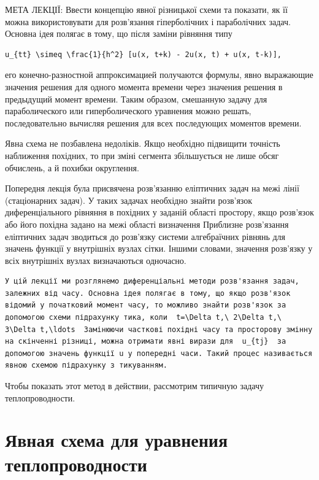 \documentclass[
  ukrainian,
]{article}
\begin{document}
МЕТА ЛЕКЦІЇ: Ввести концепцію явної різницької схеми та показати, як її
можна використовувати для розв'язання гіперболічних і параболічних
задач. Основна ідея полягає в тому, що після заміни рівняння типу

\begin{verbatim}
u_{tt} \simeq \frac{1}{h^2} [u(x, t+k) - 2u(x, t) + u(x, t-k)],
\end{verbatim}

его конечно-разностной аппроксимацией получаются формулы, явно
выражающие значения решения для одного момента времени через значения
решения в предыдущий момент времени. Таким образом, смешанную задачу для
параболического или гиперболического уравнения можно решать,
последовательно вычисляя решения для всех последующих моментов времени.

Явна схема не позбавлена недоліків. Якщо необхідно підвищити точність
наближення похідних, то при зміні сегмента збільшується не лише обсяг
обчислень, а й похибки округлення.

Попередня лекція була присвячена розв'язанню еліптичних задач на межі
лінії (стаціонарних задач). У таких задачах необхідно знайти розв'язок
диференціального рівняння в похідних у заданій області простору, якщо
розв'язок або його похідна задано на межі області визначення Приблизне
розв'язання еліптичних задач зводиться до розв'язку системи алгебраїчних
рівнянь для значень функції у внутрішніх вузлах сітки. Іншими словами,
значення розв'язку у всіх внутрішніх вузлах визначаються одночасно.

\begin{verbatim}
У цій лекції ми розглянемо диференціальні методи розв'язання задач, залежних від часу. Основна ідея полягає в тому, що якщо розв'язок відомий у початковий момент часу, то можливо знайти розв'язок за допомогою схеми підрахунку тика, коли  t=\Delta t,\ 2\Delta t,\ 3\Delta t,\ldots  Замінюючи часткові похідні часу та просторову змінну на скінченні різниці, можна отримати явні вирази для  u_{tj}  за допомогою значень функції u у попередні часи. Такий процес називається явною схемою підрахунку з тикуванням.
\end{verbatim}

Чтобы показать этот метод в действии, рассмотрим типичную задачу
теплопроводности.

\section{Явная схема для уравнения
теплопроводности}\label{ux44fux432ux43dux430ux44f-ux441ux445ux435ux43cux430-ux434ux43bux44f-ux443ux440ux430ux432ux43dux435ux43dux438ux44f-ux442ux435ux43fux43bux43eux43fux440ux43eux432ux43eux434ux43dux43eux441ux442ux438}
\end{document}
